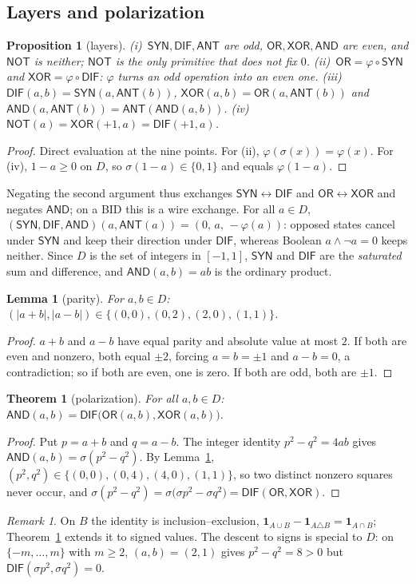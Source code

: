 \documentclass[conference]{IEEEtran}
\newcommand{\D}{D}
\newcommand{\sgn}{\sigma}
\newcommand{\fold}{\varphi}
\newcommand{\SYN}{\mathsf{SYN}}
\newcommand{\DIF}{\mathsf{DIF}}
\newcommand{\OR}{\mathsf{OR}}
\newcommand{\XOR}{\mathsf{XOR}}
\newcommand{\AND}{\mathsf{AND}}
\newcommand{\NOT}{\mathsf{NOT}}
\newcommand{\ANT}{\mathsf{ANT}}
\newtheorem{theorem}{Theorem}
\newtheorem{proposition}{Proposition}
\newtheorem{lemma}{Lemma}
\theoremstyle{remark}
\newtheorem{remark}{Remark}
\begin{document}
	\subsection{Layers and polarization}
	\begin{proposition}[layers]\label{prop:layers}
		(i)~$\SYN,\DIF,\ANT$ are odd, $\OR,\XOR,\AND$ are even, and $\NOT$ is neither; $\NOT$ is the only primitive that does not fix $0$. (ii)~$\OR=\fold\circ\SYN$ and $\XOR=\fold\circ\DIF$: $\fold$ turns an odd operation into an even one. (iii)~$\DIF(a,b)=\SYN(a,\ANT(b))$, $\XOR(a,b)=\OR(a,\ANT(b))$ and $\AND(a,\ANT(b))=\ANT(\AND(a,b))$. (iv)~$\NOT(a)=\XOR(+1,a)=\DIF(+1,a)$.
	\end{proposition}
	\begin{proof}
		Direct evaluation at the nine points. For (ii), $\fold(\sgn(x))=\fold(x)$. For (iv), $1-a\ge0$ on $\D$, so $\sgn(1-a)\in\{0,1\}$ and equals $\fold(1-a)$.
	\end{proof}
	Negating the second argument thus exchanges $\SYN\leftrightarrow\DIF$ and $\OR\leftrightarrow\XOR$ and negates $\AND$; on a BID this is a wire exchange. For all $a\in\D$, $(\SYN,\DIF,\AND)(a,\ANT(a))=(0,\,a,\,-\fold(a))$: opposed states cancel under $\SYN$ and keep their direction under $\DIF$, whereas Boolean $a\wedge\neg a=0$ keeps neither. Since $\D$ is the set of integers in $[-1,1]$, $\SYN$ and $\DIF$ are the \emph{saturated} sum and difference, and $\AND(a,b)=ab$ is the ordinary product.
	
	\begin{lemma}[parity]\label{lem:parity}
		For $a,b\in\D$: $(|a+b|,|a-b|)\in\{(0,0),(0,2),(2,0),(1,1)\}$.
	\end{lemma}
	\begin{proof}
		$a+b$ and $a-b$ have equal parity and absolute value at most $2$. If both are even and nonzero, both equal $\pm2$, forcing $a=b=\pm1$ and $a-b=0$, a contradiction; so if both are even, one is zero. If both are odd, both are $\pm1$.
	\end{proof}
	
	\begin{theorem}[polarization]\label{thm:pol}
		For all $a,b\in\D$: $\AND(a,b)=\DIF\big(\OR(a,b),\XOR(a,b)\big)$.
	\end{theorem}
	\begin{proof}
		Put $p=a+b$ and $q=a-b$. The integer identity $p^2-q^2=4ab$ gives $\AND(a,b)=\sgn(p^2-q^2)$. By Lemma~\ref{lem:parity}, $(p^2,q^2)\in\{(0,0),(0,4),(4,0),(1,1)\}$, so two distinct nonzero squares never occur, and $\sgn(p^2-q^2)=\sgn\big(\sgn p^2-\sgn q^2\big)=\DIF(\OR,\XOR)$.
	\end{proof}
	\begin{remark}
		On $B$ the identity is inclusion--exclusion, $\mathbf 1_{A\cup B}-\mathbf 1_{A\triangle B}=\mathbf 1_{A\cap B}$; Theorem~\ref{thm:pol} extends it to signed values. The descent to signs is special to $\D$: on $\{-m,\ldots,m\}$ with $m\ge2$, $(a,b)=(2,1)$ gives $p^2-q^2=8>0$ but $\DIF(\sgn p^2,\sgn q^2)=0$.
	\end{remark}
	
\end{document}
